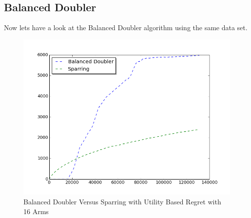 \documentclass{llncs}
\begin{document}
\subsection{Balanced Doubler}
Now lets have a look at the Balanced Doubler algorithm using the same data set.
\begin{figure}[h!]
  \centering
     \includegraphics[scale=0.3, natwidth=410,natheight=442]{figures/balanced_doubler_sparring_MQ2007_16arms.png} 
  \caption{Balanced Doubler Versus Sparring with Utility Based Regret with 16 Arms}
\end{figure}
\end{document}
